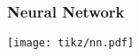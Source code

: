 \begin{frame}
\titlepage
\end{frame}



\begin{frame}
  \frametitle{Neural Network}
  \centering
  \texttt{[image: tikz/nn.pdf]}
\end{frame}
